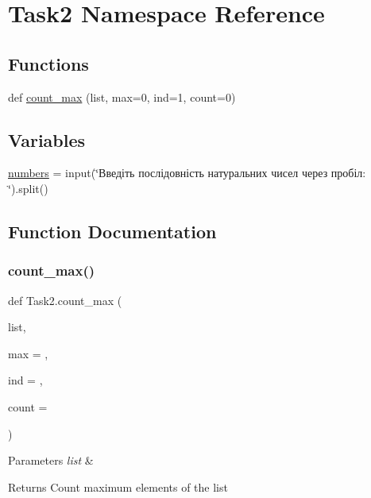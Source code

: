 \hypertarget{namespace_task2}{}\section{Task2 Namespace Reference}
\label{namespace_task2}
\subsection*{Functions}
\begin{DoxyCompactItemize}
\item 
def \hyperlink{namespace_task2_a09c06805217ffe9c9934e36287f901fa}{count\+\_\+max} (list, max=0, ind=1, count=0)
\end{DoxyCompactItemize}
\subsection*{Variables}
\begin{DoxyCompactItemize}
\item 
\hyperlink{namespace_task2_ae10806108edef00a9dbbd46e55d38545}{numbers} = input(\char`\"{}Введіть послідовність натуральних чисел через пробіл\+: \char`\"{}).split()
\end{DoxyCompactItemize}


\subsection{Function Documentation}
\mbox{\label{namespace_task2_a09c06805217ffe9c9934e36287f901fa}} 
\subsubsection{\texorpdfstring{count\+\_\+max()}{count\_max()}}
{\footnotesize\ttfamily def Task2.\+count\+\_\+max (\begin{DoxyParamCaption}\item[{}]{list,  }\item[{}]{max = {},  }\item[{}]{ind = {},  }\item[{}]{count = {} }\end{DoxyParamCaption})}


\begin{DoxyParams}{Parameters}
{\em list} & \\
\hline
\end{DoxyParams}
\begin{DoxyReturn}{Returns}
Count maximum elements of the list 
\end{DoxyReturn}


